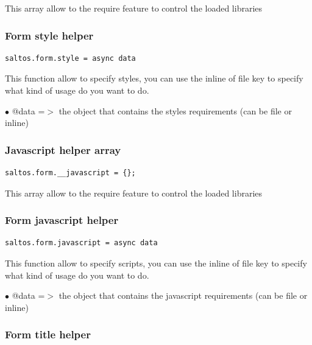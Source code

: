 \documentclass[a4paper]{article}
\begin{document}
This array allow to the require feature to control the loaded libraries

\hypertarget{toc227}{}
\subsubsection{Form style helper}

\begin{lstlisting}
saltos.form.style = async data
\end{lstlisting}

This function allow to specify styles, you can use the inline of file key to specify
what kind of usage do you want to do.

\begin{compactitem}
\item[\color{myblue}$\bullet$] @data =$>$ the object that contains the styles requirements (can be file or inline)
\end{compactitem}

\hypertarget{toc228}{}
\subsubsection{Javascript helper array}

\begin{lstlisting}
saltos.form.__javascript = {};
\end{lstlisting}

This array allow to the require feature to control the loaded libraries

\hypertarget{toc229}{}
\subsubsection{Form javascript helper}

\begin{lstlisting}
saltos.form.javascript = async data
\end{lstlisting}

This function allow to specify scripts, you can use the inline of file key to specify
what kind of usage do you want to do.

\begin{compactitem}
\item[\color{myblue}$\bullet$] @data =$>$ the object that contains the javascript requirements (can be file or inline)
\end{compactitem}

\hypertarget{toc230}{}
\subsubsection{Form title helper}
\end{document}
